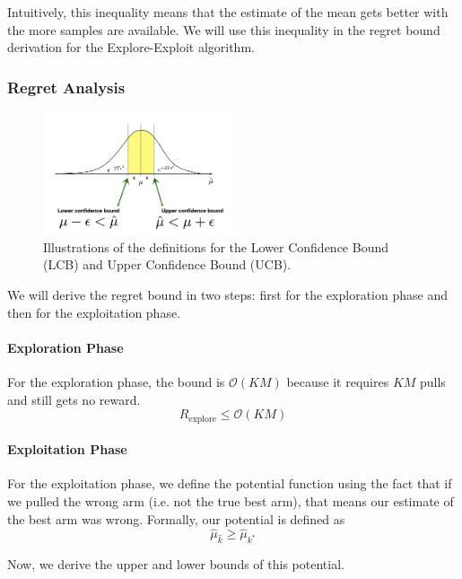 \documentclass[11pt]{article}
\begin{document}
\normalfont
Intuitively, this inequality means that the estimate of the mean gets better with the more samples are available. We will use this inequality in the
regret bound derivation for the Explore-Exploit algorithm.

\subsubsection{Regret Analysis}

\begin{figure}
    \centering
    \includegraphics[width=0.5\textwidth]{images/ucb_lcb.png}
    \caption{Illustrations of the definitions for the Lower Confidence Bound (LCB) and Upper Confidence Bound (UCB).}
    \label{fig:ucb_lcb}
\end{figure}

We will derive the regret bound in two steps: first for the exploration phase
and then for the exploitation phase.

\paragraph{Exploration Phase}
For the exploration phase, the bound is $\mathcal{O}(KM)$ because it requires $KM$
pulls and still gets no reward. $$ R_{\text{explore}} \leq \mathcal{O}(KM)$$

\paragraph{Exploitation Phase}
For the exploitation phase, we define the potential function using the fact
that if we pulled the wrong arm (i.e. not the true best arm), that means
our estimate of the best arm was wrong. Formally, our potential is defined
as
\[
\hat{\mu}_{\hat{k}} \geq \hat{\mu}_{k^*}
\]

Now, we derive the upper and lower bounds of this potential.
\end{document}
